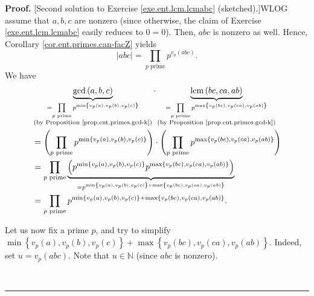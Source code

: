 \documentclass[numbers=enddot,12pt,final,onecolumn,notitlepage]{scrartcl}%
\numberwithin{exer}{subsection}
\theoremstyle{definition}
\newenvironment{fineprint}{\begin{small}}{\end{small}}
\newenvironment{proof}[1][Proof]{\noindent\textbf{#1.} }{\ \rule{0.5em}{0.5em}}
\let\prodnonlimits\prod
\renewcommand{\prod}{\prodnonlimits\limits}
\begin{document}
\begin{fineprint}
\begin{proof}
[Second solution to Exercise \ref{exe.ent.lcm.lcmabc} (sketched).]WLOG assume
that $a,b,c$ are nonzero (since otherwise, the claim of Exercise
\ref{exe.ent.lcm.lcmabc} easily reduces to $0=0$). Then, $abc$ is nonzero as
well. Hence, Corollary \ref{cor.ent.primes.can-facZ} yields%
\[
\left\vert abc\right\vert =\prod_{p\text{ prime}}p^{v_{p}\left(  abc\right)
}.
\]
We have%
\begin{align}
&  \underbrace{\gcd\left(  a,b,c\right)  }_{\substack{=\prod\limits_{p\text{
prime}}p^{\min\left\{  v_{p}\left(  a\right)  ,v_{p}\left(  b\right)
,v_{p}\left(  c\right)  \right\}  }\\\text{(by Proposition
\ref{prop.ent.primes.gcd-k})}}}\cdot\underbrace{\operatorname{lcm}\left(
bc,ca,ab\right)  }_{\substack{=\prod\limits_{p\text{ prime}}p^{\max\left\{
v_{p}\left(  bc\right)  ,v_{p}\left(  ca\right)  ,v_{p}\left(  ab\right)
\right\}  }\\\text{(by Proposition \ref{prop.ent.primes.gcd-k})}}}\nonumber\\
&  =\left(  \prod\limits_{p\text{ prime}}p^{\min\left\{  v_{p}\left(
a\right)  ,v_{p}\left(  b\right)  ,v_{p}\left(  c\right)  \right\}  }\right)
\cdot\left(  \prod\limits_{p\text{ prime}}p^{\max\left\{  v_{p}\left(
bc\right)  ,v_{p}\left(  ca\right)  ,v_{p}\left(  ab\right)  \right\}
}\right) \nonumber\\
&  =\prod\limits_{p\text{ prime}}\underbrace{\left(  p^{\min\left\{
v_{p}\left(  a\right)  ,v_{p}\left(  b\right)  ,v_{p}\left(  c\right)
\right\}  }p^{\max\left\{  v_{p}\left(  bc\right)  ,v_{p}\left(  ca\right)
,v_{p}\left(  ab\right)  \right\}  }\right)  }_{=p^{\min\left\{  v_{p}\left(
a\right)  ,v_{p}\left(  b\right)  ,v_{p}\left(  c\right)  \right\}
+\max\left\{  v_{p}\left(  bc\right)  ,v_{p}\left(  ca\right)  ,v_{p}\left(
ab\right)  \right\}  }}\nonumber\\
&  =\prod\limits_{p\text{ prime}}p^{\min\left\{  v_{p}\left(  a\right)
,v_{p}\left(  b\right)  ,v_{p}\left(  c\right)  \right\}  +\max\left\{
v_{p}\left(  bc\right)  ,v_{p}\left(  ca\right)  ,v_{p}\left(  ab\right)
\right\}  }. \label{sol.ent.lcm.lcmabc.2nd.2}%
\end{align}


Let us now fix a prime $p$, and try to simplify \newline$\min\left\{
v_{p}\left(  a\right)  ,v_{p}\left(  b\right)  ,v_{p}\left(  c\right)
\right\}  +\max\left\{  v_{p}\left(  bc\right)  ,v_{p}\left(  ca\right)
,v_{p}\left(  ab\right)  \right\}  $. Indeed, set $u=v_{p}\left(  abc\right)
$. Note that $u\in\mathbb{N}$ (since $abc$ is nonzero).


\end{proof}
\end{fineprint}
\end{document}
